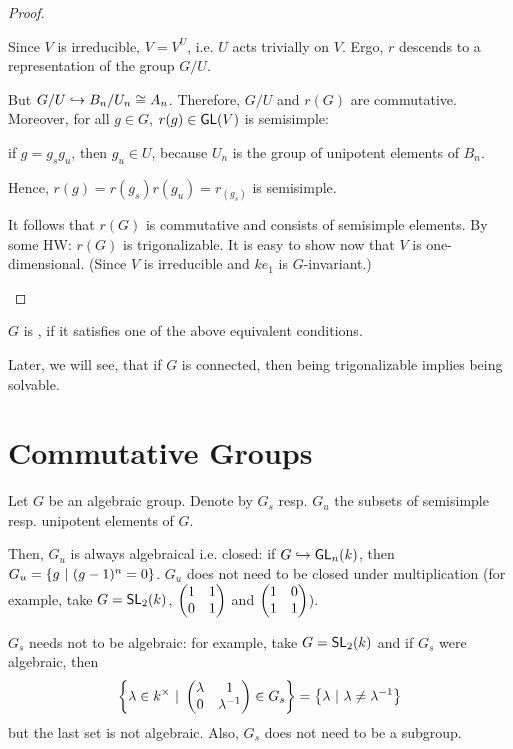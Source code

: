 \begin{proof}
\begin{enumerate}
Since $V$ is irreducible, $V = V^U$, i.e. $U$ acts trivially on $V$. Ergo, $r$ descends to a representation of the group $G/U$.

But $G/U \overset{}{\hookrightarrow} B_n / U_n \overset{}{\cong} A_n$. Therefore, $G/U$ and $r(G)$ are commutative. Moreover, for all $g \in G$, $r(g) \in \textsf{GL}(V)$ is semisimple:

if $g = g_sg_u$, then $g_u \in U$, because $U_n$ is the group of unipotent elements of $B_n$.

Hence, $r(g) = r(g_s) r(g_u) = r_(g_s)$ is semisimple.

It follows that $r(G)$ is commutative and consists of semisimple elements. By some HW: $r(G)$ is trigonalizable. It is easy to show now that $V$ is one-dimensional. (Since $V$ is irreducible and $ke_1$ is $G$-invariant.)
\end{enumerate}
\end{proof}
\begin{definition}
	$G$ is , if it satisfies one of the above equivalent conditions.
\end{definition}
	Later, we will see, that if $G$ is connected, then being trigonalizable implies being solvable.
	
	
\section{Commutative Groups}
Let $G$ be an algebraic group. Denote by $G_s$ resp. $G_u$ the subsets of semisimple resp. unipotent elements of $G$.

Then, $G_u$ is always algebraical i.e. closed: if $G \overset{}{\hookrightarrow} \textsf{GL}_n(k)$, then $G_u = \left\lbrace g ~ | ~ (g-1)^n = 0\right\rbrace$.
$G_u$ does not need to be closed under multiplication (for example, take $G = \textsf{SL}_2(k)$, $\left(\begin{matrix} 1 & 1 \\ 0 & 1 \end{matrix}\right)$ and $\left(\begin{matrix} 1 & 0\\ 1 & 1 \end{matrix}\right)$).

$G_s$ needs not to be algebraic: for example, take $G = \textsf{SL}_2(k)$ and if $G_s$ were algebraic, then
\[ \left\lbrace\lambda \in k^\times ~ | ~ 
\left(\begin{matrix} \lambda & 1\\ 0 & \lambda^{-1} \end{matrix}\right) \in G_s
\right\rbrace = \left\lbrace \lambda ~ | ~ \lambda \neq \lambda^{-1}\right\rbrace \]
but the last set is not algebraic. Also, $G_s$ does not need to be a subgroup.